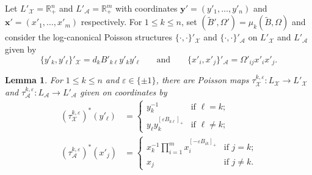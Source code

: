 \documentclass{amsart}
\newtheorem{lemma}[theorem]{Lemma}
\numberwithin{equation}{section}
\newcommand{\bfx}{\mathbf{x}}
\newcommand{\bfy}{\mathbf{y}}
\newcommand{\cA}{\mathcal{A}}
\newcommand{\cX}{\mathcal{X}}
\newcommand{\RR}{\mathbb{R}}
\begin{document}
Let $L'_\cX=\RR_+^n$ and $L'_\cA=\RR_+^m$ with coordinates $\bfy'=(y'_1,\ldots,y'_n)$ and $\bfx'=(x'_1,\ldots,x'_m)$ respectively.
For $1\le k\le n$, set $(\tilde B',\Omega')=\mu_k(\tilde B,\Omega)$ and consider the log-canonical Poisson structures $\{\cdot,\cdot\}'_\cX$ and $\{\cdot,\cdot\}'_\cA$ on $L'_\cX$ and $L'_\cA$ given by
\begin{equation}
  \label{eq:brackets}
  \{y'_k,y'_\ell\}'_\cX=d_kB'_{k\ell}y'_ky'_\ell\qquad\text{and}\qquad\{x'_i,x'_j\}'_\cA=\Omega'_{ij}x'_ix'_j.
\end{equation}
\begin{lemma}
  \label{le:tropical cluster transformations}
  For $1\le k\le n$ and $\varepsilon\in\{\pm1\}$, there are Poisson maps $\tau_\cX^{k,\varepsilon}:L_\cX\to L'_\cX$ and $\tau_\cA^{k,\varepsilon}:L_\cA\to L'_\cA$ given on coordinates by
  \begin{align}
    \label{eq:tropical X transformation}
    (\tau_\cX^{k,\varepsilon})^*(y'_\ell)
    &=\begin{cases} 
      y_k^{-1} & \text{if $\ell=k$;}\\ 
      y_\ell y_k^{[\varepsilon B_{k\ell}]_+} & \text{if $\ell\ne k$;}
    \end{cases}\\
    \label{eq:tropical A transformation}
    (\tau_\cA^{k,\varepsilon})^*(x'_j)
    &=\begin{cases} 
      x_k^{-1}\prod\limits_{i=1}^m x_i^{[-\varepsilon B_{ik}]_+} & \text{if $j=k$;}\\
      x_j & \text{if $j\ne k$.}
    \end{cases}
  \end{align}
\end{lemma}
\end{document}
